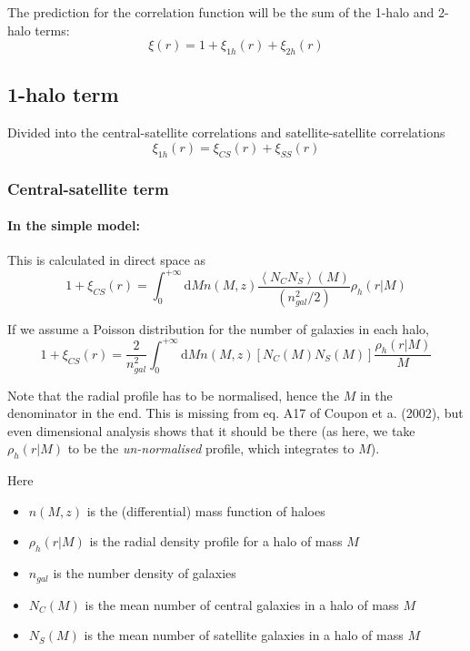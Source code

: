 \documentclass[10pt,a4paper]{article}
\begin{document}
The prediction for the correlation function will be the sum of the 1-halo and 2-halo terms:
\begin{equation}
\xi(r) = 1 + \xi_{1h}(r) + \xi_{2h}(r)
\end{equation}

\subsection{1-halo term}

Divided into the central-satellite correlations and satellite-satellite correlations
\begin{equation}
\xi_{1h}(r) = \xi_{CS}(r) + \xi_{SS}(r)
\end{equation}

\subsubsection{Central-satellite term}

\paragraph{In the simple model:}



This is calculated in direct space as
\begin{equation}
1 + \xi_{CS}(r) = \int_0^{+\infty} \mathrm{d}M n(M,z) \frac{\left\langle N_C N_S\right\rangle(M)}{(n_{gal}^2/2)}\rho_h(r|M)
\end{equation}

If we assume a Poisson distribution for the number of galaxies in each halo,
\begin{equation}
1 + \xi_{CS}(r) = \frac{2}{n_{gal}^2} \int_0^{+\infty} \mathrm{d}M n(M,z) \left[N_C(M) N_S(M)\right] \frac{\rho_h(r|M)}{M}
\end{equation}

Note that the radial profile has to be normalised, hence the $M$ in the denominator in the end. 
This is missing from eq. A17 of Coupon et a. (2002), but even dimensional analysis shows that it should be there (as here, we take $\rho_h(r|M)$ to be the \emph{un-normalised} profile, which integrates to $M$).

Here
\begin{itemize}
\item $n(M,z)$ is the (differential) mass function of haloes
\item $\rho_h(r|M)$ is the radial density profile for a halo of mass $M$
\item $n_{gal}$ is the number density of galaxies
\item $N_C(M)$ is the mean number of central galaxies in a halo of mass $M$
\item $N_S(M)$ is the mean number of satellite galaxies in a halo of mass $M$
\end{itemize}
\end{document}
